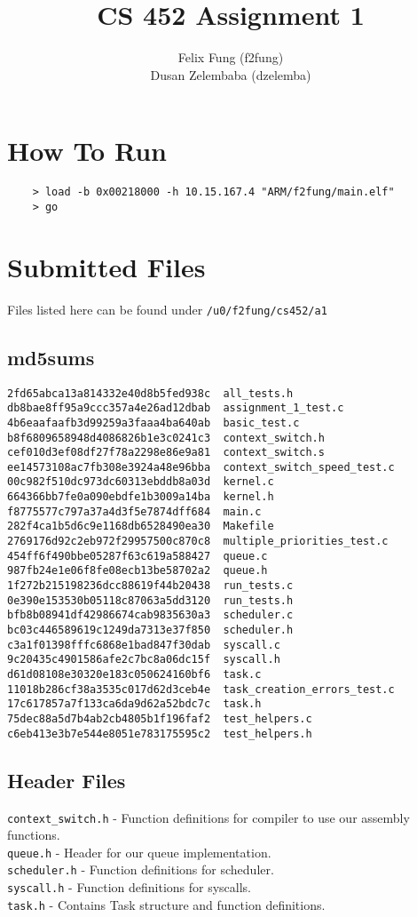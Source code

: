 \documentclass[letterpaper]{article}
\begin{document}
\title{CS 452 Assignment 1}
\author{Felix Fung (f2fung) \\ Dusan Zelembaba (dzelemba)}
\maketitle

\section{How To Run}
\begin{verbatim}
	> load -b 0x00218000 -h 10.15.167.4 "ARM/f2fung/main.elf"
	> go
\end{verbatim}

\section{Submitted Files}
Files listed here can be found under \verb!/u0/f2fung/cs452/a1!

\subsection{md5sums}
\begin{verbatim}
2fd65abca13a814332e40d8b5fed938c  all_tests.h
db8bae8ff95a9ccc357a4e26ad12dbab  assignment_1_test.c
4b6eaafaafb3d99259a3faaa4ba640ab  basic_test.c
b8f6809658948d4086826b1e3c0241c3  context_switch.h
cef010d3ef08df27f78a2298e86e9a81  context_switch.s
ee14573108ac7fb308e3924a48e96bba  context_switch_speed_test.c
00c982f510dc973dc60313ebddb8a03d  kernel.c
664366bb7fe0a090ebdfe1b3009a14ba  kernel.h
f8775577c797a37a4d3f5e7874dff684  main.c
282f4ca1b5d6c9e1168db6528490ea30  Makefile
2769176d92c2eb972f29957500c870c8  multiple_priorities_test.c
454ff6f490bbe05287f63c619a588427  queue.c
987fb24e1e06f8fe08ecb13be58702a2  queue.h
1f272b215198236dcc88619f44b20438  run_tests.c
0e390e153530b05118c87063a5dd3120  run_tests.h
bfb8b08941df42986674cab9835630a3  scheduler.c
bc03c446589619c1249da7313e37f850  scheduler.h
c3a1f01398fffc6868e1bad847f30dab  syscall.c
9c20435c4901586afe2c7bc8a06dc15f  syscall.h
d61d08108e30320e183c050624160bf6  task.c
11018b286cf38a3535c017d62d3ceb4e  task_creation_errors_test.c
17c617857a7f133ca6da9d62a52bdc7c  task.h
75dec88a5d7b4ab2cb4805b1f196faf2  test_helpers.c
c6eb413e3b7e544e8051e783175595c2  test_helpers.h
\end{verbatim}

\subsection{Header Files}
\verb!context_switch.h! - Function definitions for compiler to use our assembly functions.\\
\verb!queue.h! - Header for our queue implementation.\\
\verb!scheduler.h! - Function definitions for scheduler.\\
\verb!syscall.h! - Function definitions for syscalls.\\
\verb!task.h! - Contains Task structure and function definitions.
\end{document}
